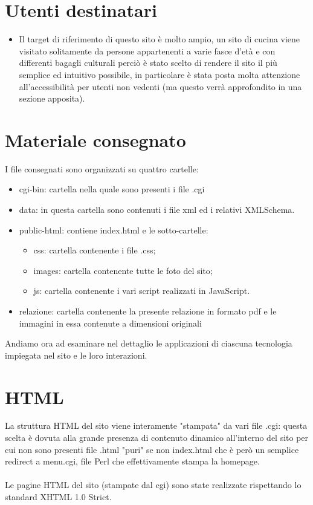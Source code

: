 \documentclass[12pt]{article}
\begin{document}
		\section{Utenti destinatari}
		\begin{itemize}
			\item Il target di riferimento di questo sito \`e molto ampio, un sito di cucina viene visitato solitamente da persone appartenenti a varie fasce d'et\`a e con differenti bagagli culturali perci\`o \`e stato scelto di rendere il sito il più semplice ed intuitivo possibile, in particolare \`e stata posta molta attenzione all'accessibilità per utenti non vedenti (ma questo verr\`a approfondito in una sezione apposita). 

		\end{itemize}
		
			\section{Materiale consegnato}
			
			 I file consegnati sono organizzati su quattro cartelle:
			\begin{itemize}
				\item cgi-bin: cartella nella quale sono presenti i file .cgi
				\item data: in questa cartella sono contenuti i file xml ed i relativi XMLSchema.
				\item public-html: contiene index.html e le sotto-cartelle:
\begin{itemize}
\item css: cartella contenente i file .css;
		\item		 images: cartella contenente tutte le foto del sito;
			\item	 js: cartella contenente i vari script realizzati in JavaScript.
\end{itemize}		
\item relazione: cartella contenente la presente relazione in formato pdf e le immagini in essa contenute a dimensioni originali		 
			\end{itemize}	Andiamo ora ad esaminare nel dettaglio le applicazioni di ciascuna tecnologia impiegata nel sito e le loro interazioni. 
			\newpage
			\section{HTML}

 La struttura HTML del sito viene interamente "stampata" da vari file .cgi: questa scelta \`e dovuta alla grande presenza di contenuto dinamico all'interno del sito per cui non sono presenti file .html "puri" se non index.html che \`e per\`o un semplice redirect a menu.cgi, file Perl che effettivamente stampa la homepage. \\ \\
Le pagine HTML del sito (stampate dal cgi) sono state realizzate rispettando lo standard XHTML 1.0 Strict.
\end{document}
